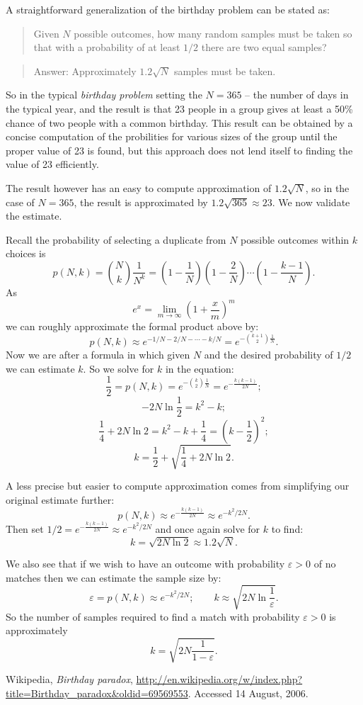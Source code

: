 \documentclass[12pt]{article}
\begin{document}
A straightforward generalization of the birthday problem can be stated as:
\begin{quote}
Given $N$ possible outcomes, how many random samples must be taken so that with a probability of at least $1/2$ there are two equal samples?
\end{quote}
\begin{quote}
Answer: Approximately $1.2\sqrt{N}$ samples must be taken.
\end{quote}

So in the typical \emph{birthday problem} setting the $N=365$ -- the number of days in the typical year, and the result is that 23 people in a group gives at least a 50\% chance of two people with a common birthday.  This result can be obtained by a concise computation of the probilities for various sizes of the group until the proper value of 23 is found, but this approach does not lend itself to finding the value of 23 efficiently.  

The result however has an easy to compute approximation of $1.2\sqrt{N}$, so in the case of $N=365$, the result is approximated by $1.2\sqrt{365}\approx 23$.  We now validate the estimate.

Recall the probability of selecting a duplicate from $N$ possible outcomes within $k$ choices is
\[p(N,k)=\binom{N}{k}\frac{1}{N^k}
=\left(1-\frac{1}{N}\right)\left(1-\frac{2}{N}\right)
\cdots\left(1-\frac{k-1}{N}\right).\]
As 
\[e^x=\lim_{m\rightarrow \infty}\left( 1+ \frac{x}{m}\right)^{m}\]
we can roughly approximate the formal product above by:
\[p(N,k)\approx e^{-1/N-2/N-\cdots - k/N}=e^{-\binom{k+1}{2}\frac{1}{N}}.\]
Now we are after a formula in which given $N$ and the desired probability of $1/2$ we can estimate $k$.  So we solve for $k$ in the equation:
\[\frac{1}{2}=p(N,k)=e^{-\binom{k}{2}\frac{1}{N}}=e^{-\frac{k(k-1)}{2N}};\]
\[-2N\ln \frac{1}{2} = k^2-k;\]
\[\frac{1}{4}+2N\ln 2 = k^2-k+\frac{1}{4}=\left( k-\frac{1}{2}\right)^2;\]
\begin{equation}\label{eq:2}
k=\frac{1}{2}+\sqrt{\frac{1}{4}+2N\ln 2}.
\end{equation}

A less precise but easier to compute approximation comes from simplifying our original estimate further:
\[p(N,k)\approx e^{-\frac{k(k-1)}{2N}}\approx e^{-k^2/2N}.\]
Then set $\displaystyle 1/2=e^{-\frac{k(k-1)}{2N}}\approx e^{-k^2/2N}$ and once
again solve for $k$ to find:
\[k=\sqrt{2N \ln 2}\approx 1.2\sqrt{N}.\]

We also see that if we wish to have an outcome with probability $\varepsilon>0$ of no matches then we can estimate the sample size by:
\[\varepsilon=p(N,k)\approx e^{-k^2/2N};\qquad k\approx \sqrt{2N \ln \frac{1}{\varepsilon}}.\]
So the number of samples required to find a match with probability $\varepsilon>0$ is approximately
\[k=\sqrt{2N\frac{1}{1-\varepsilon}}.\]

\begin{thebibliography}{9}
Wikipedia, \emph{Birthday paradox}, 
\url{http://en.wikipedia.org/w/index.php?title=Birthday_paradox&oldid=69569553}.  Accessed 14 August, 2006.
\end{thebibliography}
\end{document}
